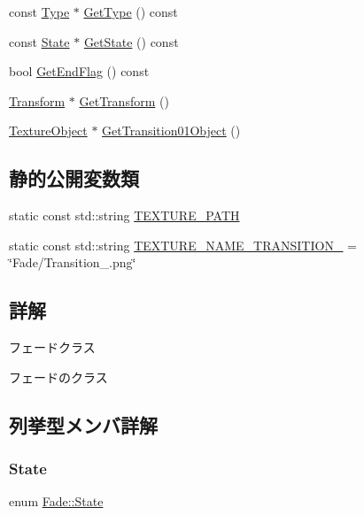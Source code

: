 \begin{DoxyCompactItemize}
\item 
const \mbox{\hyperlink{class_fade_ac06f27215b454aa05b93c236476d6e80}{Type}} $\ast$ \mbox{\hyperlink{class_fade_aed5a29d39a5fd6161a9aed73d5f30870}{Get\+Type}} () const
\item 
const \mbox{\hyperlink{class_fade_ae77826bf3ff2ab95fb7b3b6f95cba80a}{State}} $\ast$ \mbox{\hyperlink{class_fade_aeb41dfcadf75dd4c980da68e243cc310}{Get\+State}} () const
\item 
bool \mbox{\hyperlink{class_fade_acc8adf28ce2e4270e5fb3907d83dadd0}{Get\+End\+Flag}} () const
\item 
\mbox{\hyperlink{class_transform}{Transform}} $\ast$ \mbox{\hyperlink{class_fade_a1a177209e72a27858ceb2d339321e9c4}{Get\+Transform}} ()
\item 
\mbox{\hyperlink{class_texture_object}{Texture\+Object}} $\ast$ \mbox{\hyperlink{class_fade_a4e047c532d430095e7d0d70288289a82}{Get\+Transition01\+Object}} ()
\end{DoxyCompactItemize}
\subsection*{静的公開変数類}
\begin{DoxyCompactItemize}
\item 
static const std\+::string \mbox{\hyperlink{class_fade_acd9c0d6231180af183d6301f31fa0053}{T\+E\+X\+T\+U\+R\+E\+\_\+\+P\+A\+TH}}
\item 
static const std\+::string \mbox{\hyperlink{class_fade_ab5d6f86f07e33205224fa486ff22c51d}{T\+E\+X\+T\+U\+R\+E\+\_\+\+N\+A\+M\+E\+\_\+\+T\+R\+A\+N\+S\+I\+T\+I\+O\+N\+\_}} = \char`\"{}Fade/Transition\+\_.\+png\char`\"{}
\end{DoxyCompactItemize}


\subsection{詳解}
フェードクラス 

フェードのクラス 

\subsection{列挙型メンバ詳解}
\mbox{\label{class_fade_ae77826bf3ff2ab95fb7b3b6f95cba80a}} 
\subsubsection{\texorpdfstring{State}{State}}
{\footnotesize\ttfamily enum \mbox{\hyperlink{class_fade_ae77826bf3ff2ab95fb7b3b6f95cba80a}{Fade\+::\+State}}}


